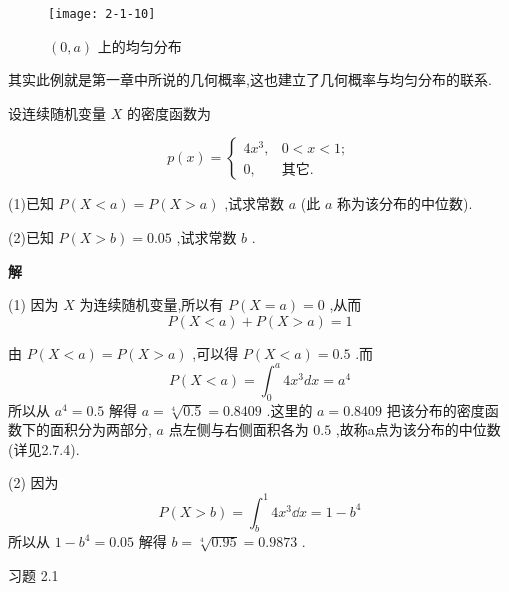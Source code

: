 \begin{figure}
	\centering
	\texttt{[image: 2-1-10]}
	\caption{ $ (0,a) $ 上的均匀分布}
	\label{fig:2.1.10}
\end{figure}

其实此例就是第一章中所说的几何概率,这也建立了几何概率与均匀分布的联系.

\begin{example}\label{exam:2.1.12}
	设连续随机变量 $ X $ 的密度函数为
	
	\[ 
	p(x)=\left\{\begin{array}{ll}
	{4 x^{3},} & {0<x<1}; \\ 
	{0},&{\text{其它}}.
	\end{array}\right.
	\]
	
	(1)已知 $ P(X<a)=P(X>a) $ ,试求常数 $ a $ (此 $ a $ 称为该分布的中位数).
	
	(2)已知 $ P(X>b)=0.05 $ ,试求常数 $ b $ .
	
	\textbf{解}
	
	(1) 因为 $ X $ 为连续随机变量,所以有 $ P(X=a)=0 $ ,从而
	\[ 
	P(X<a)+P(X>a)=1
	\]
	
	由 $ P(X<a)=P(X>a) $ ,可以得 $ P(X<a)=0.5 $ .而
	\[ 
	P(X<a)=\int_{0}^{a} 4 x^{3} d x=a^{4}
	\]
	所以从 $ a^4=0.5 $ 解得 $ a=\sqrt[4]{0.5}=0.8409 $ .这里的 $ a=0.8409 $ 把该分布的密度函数下的面积分为两部分, $ a $ 点左侧与右侧面积各为 $ 0.5 $ ,故称a点为该分布的中位数(详见2.7.4).
	
	(2) 因为
	\[ 
	P(X>b)=\int_{b}^{1} 4 x^{3} \dd x=1-b^{4}
	\]
	所以从 $ 1-b^{4}=0.05 $ 解得 $ b=\sqrt[4]{0.95}=0.9873 $ .
\end{example}

习题 2.1

